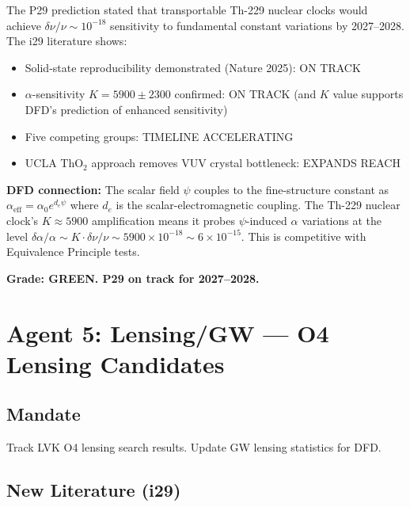 \documentclass[11pt,a4paper]{article}
\begin{document}
The P29 prediction stated that transportable Th-229 nuclear clocks would achieve $\delta\nu/\nu \sim 10^{-18}$ sensitivity to fundamental constant variations by 2027--2028. The i29 literature shows:

\begin{itemize}
\item Solid-state reproducibility demonstrated (Nature 2025): ON TRACK
\item $\alpha$-sensitivity $K = 5900 \pm 2300$ confirmed: ON TRACK (and $K$ value supports DFD's prediction of enhanced sensitivity)
\item Five competing groups: TIMELINE ACCELERATING
\item UCLA ThO$_2$ approach removes VUV crystal bottleneck: EXPANDS REACH
\end{itemize}

\textbf{DFD connection:} The scalar field $\psi$ couples to the fine-structure constant as $\alpha_\mathrm{eff} = \alpha_0 e^{d_e \psi}$ where $d_e$ is the scalar-electromagnetic coupling. The Th-229 nuclear clock's $K \approx 5900$ amplification means it probes $\psi$-induced $\alpha$ variations at the level $\delta\alpha/\alpha \sim K \cdot \delta\nu/\nu \sim 5900 \times 10^{-18} \sim 6 \times 10^{-15}$. This is competitive with Equivalence Principle tests.

\textbf{Grade: GREEN. P29 on track for 2027--2028.}

\section{Agent 5: Lensing/GW --- O4 Lensing Candidates}

\subsection{Mandate}
Track LVK O4 lensing search results. Update GW lensing statistics for DFD.

\subsection{New Literature (i29)}
\end{document}
